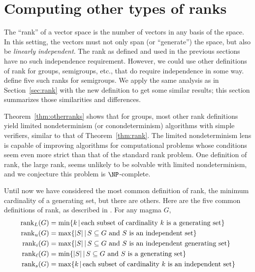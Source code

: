 \section{Computing other types of ranks}
\label{sec:otherranks}

%
%
%
The ``rank'' of a vector space is the number of vectors in any basis of the space.
In this setting, the vectors must not only span (or ``generate'') the space, but also be \emph{linearly independent}.
The rank as defined and used in the previous sections have no such independence requirement.
%
%
However, we could use other definitions of rank for groups, semigroups, etc., that do require independence in some way.
\autocite{hr99, hr00} define five such ranks for semigroups.
%
%
We apply the same analysis as in Section~\ref{sec:rank} with the new definition to get some similar results;
%
%
this section summarizes those similarities and differences.

%
%
%
Theorem~\ref{thm:otherranks} shows that for groups, most other rank definitions yield limited nondeterminism (or conondeterminism) algorithms with simple verifiers, similar to that of Theorem~\ref{thm:rank}.
%
%
The limited nondeterminism lens is capable of improving algorithms for computational problems whose conditions seem even more strict than that of the standard rank problem.
%
One definition of rank, the large rank, seems unlikely to be solvable with limited nondeterminism, and we conjecture this problem is $\NP$-complete.

Until now we have considered the most common definition of rank, the minimum cardinality of a generating set, but there are others.
Here are the five common definitions of rank, as described in \autocite{hr99, hr00}.
For any magma $G$,
\begin{align*}
  \operatorname{rank}_L(G) & = \min \{ k \, | \, \text{each subset of cardinality } k \text{ is a generating set}\} \\
  \operatorname{rank}_u(G) & = \max \{ |S| \, | \, S \subseteq G \text{ and } S \text{ is an independent set} \} \\
  \operatorname{rank}_i(G) & = \max \{ |S| \, | \, S \subseteq G \text{ and } S \text{ is an independent generating set} \} \\
  \operatorname{rank}_\ell(G) & = \min \{ |S| \, | \, S \subseteq G \text{ and } S \text{ is a generating set} \} \\
  \operatorname{rank}_s(G) & = \max \{ k \, | \, \text{each subset of cardinality } k \text{ is an independent set} \}
\end{align*}

